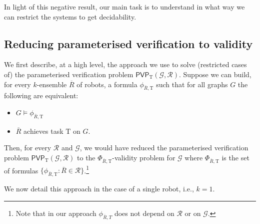 \documentclass{aamas2015}
\def\gclass{\mathcal{G}}
\def\rclass{\mathcal{R}}
\def\T{\mathrm{T}}
\def\PVP{\mathsf{PVP}}
\newcommand{\tup}[1]{\overline{#1}}
\begin{document}
In light of this negative result, our main task is to understand in what way we can restrict the systems to get decidability. 


\subsection{Reducing parameterised verification to validity} \label{subsec:reduc}
We first describe, at a high level, the approach we use to solve (restricted cases of) the parameterised verification problem $\PVP_\T(\gclass,\rclass)$.
Suppose we can build, for every $k$-ensemble $\tup{R}$ of robots, a formula $\phi_{\tup{R},\T}$ such that for all graphs $G$ the following are equivalent:
\begin{itemize}
\item $G \models \phi_{\tup{R},\T}$
\item $\tup{R}$ achieves task $\T$ on $G$. 
\end{itemize}
Then, for every $\rclass$ and $\gclass$, we would have reduced the parameterised verification problem $\PVP_\T(\gclass,\rclass)$ to the $\Phi_{\tup{R},\T}$-validity problem for $\gclass$ where $\Phi_{\tup{R},\T}$ is the set of formulas $\{\phi_{\tup{R},\T} : \tup{R} \in \rclass\}$.\footnote{Note that in our approach $\phi_{\tup{R},T}$ does not depend on $\rclass$ or on $\gclass$.} 

We now detail this approach in the case of a single robot, i.e., $k=1$.
\end{document}
